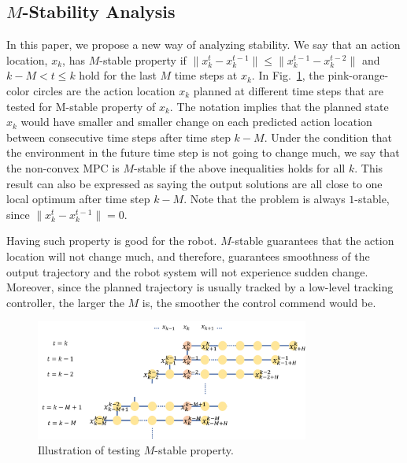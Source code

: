 \subsection{$M$-Stability Analysis}
In this paper, we propose a new way of analyzing stability.
We say that an action location, $x_{k}$, has $M$-stable property if $\|x_{k}^t-x_k^{t-1}\|\leq \|x_k^{t-1}-x_k^{t-2}\|$ and $k-M< t\leq k$ hold for the last $M$ time steps at $x_{k}$. In Fig.~\ref{fig:m-stable}, the pink-orange-color circles are the action location $x_{k}$ planned at different time steps that are  tested for M-stable property of $x_{k}$. The notation implies that the planned state $x_k$ would have smaller and smaller change on each predicted action location between consecutive time steps after time step $k-M$. Under the condition that the environment in the future time step is not going to change much, we say that the non-convex MPC is $M$-stable if the above inequalities holds for all $k$. This result can also be expressed as saying the output solutions are all close to one local optimum after time step $k-M$. Note that the problem is always $1$-stable, since $\|x_{k}^t-x_k^{t-1}\|=0$.

Having such property is good for the robot. $M$-stable guarantees that the action location will not change much, and therefore, guarantees smoothness of the output trajectory and the robot system will not experience sudden change. Moreover, since the planned trajectory is usually tracked by a low-level tracking controller, the larger the $M$ is, the smoother the control commend would be.

\begin{figure}[t]
\begin{center}
\includegraphics[width=9cm]{src/Mstable.png}
\caption{Illustration of testing $M$-stable property.}
\label{fig:m-stable}
\end{center}
\end{figure}


